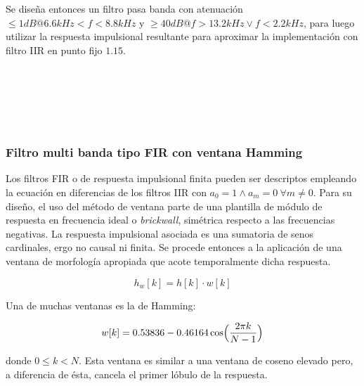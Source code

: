 \documentclass[11pt, journal]{IEEEtran}
\begin{document}
Se diseña entonces un filtro pasa banda con atenuación
\(\leq 1 dB @ 6.6 kHz < f < 8.8 kHz\) y
\(\geq 40 dB @ f > 13.2 kHz \lor f < 2.2 kHz\), para luego utilizar la
respuesta impulsional resultante para aproximar la implementación con
filtro IIR en punto fijo \(1.15\).


    \begin{center}
    \end{center}
    { \hspace*{\fill} \\}
    

    \begin{center}
    \end{center}
    { \hspace*{\fill} \\}
    

    \begin{center}
    \end{center}
    { \hspace*{\fill} \\}
    
    \subsubsection{Filtro multi banda tipo FIR con ventana Hamming}

Los filtros FIR o de respuesta impulsional finita pueden ser descriptos
empleando la ecuación en diferencias de los filtros IIR con
\(a_0 = 1 \land a_m = 0\ \forall m \neq 0\). Para su diseño, el uso del
método de ventana parte de una plantilla de módulo de respuesta en
frecuencia ideal o \emph{brickwall}, simétrica respecto a las
frecuencias negativas. La respuesta impulsional asociada es una
sumatoria de senos cardinales, ergo no causal ni finita. Se procede
entonces a la aplicación de una ventana de morfología apropiada que
acote temporalmente dicha respuesta.

\[
h_w[k] = h[k] \cdot w[k]
\]

Una de muchas ventanas es la de Hamming:

\[
w[k] = 0.53836 - 0.46164 \cos\Bigl(\frac{2 \pi k}{N - 1}\Bigr)
\]

donde \(0 \leq k < N\). Esta ventana es similar a una ventana de coseno
elevado pero, a diferencia de ésta, cancela el primer lóbulo de la
respuesta.
\end{document}

